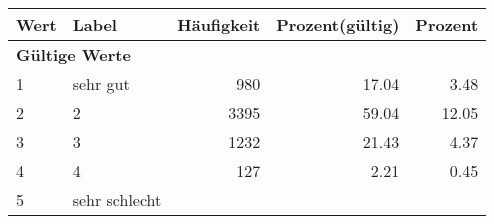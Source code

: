      \begin{longtable}{lXrrr}
     \toprule
     \textbf{Wert} & \textbf{Label} & \textbf{Häufigkeit} & \textbf{Prozent(gültig)} & \textbf{Prozent} \\
     \endhead
     \midrule
     \multicolumn{5}{l}{\textbf{Gültige Werte}}\\

     1 &
     \multicolumn{1}{X}{ sehr gut   } &


       \num{980} &
       \num[round-mode=places,round-precision=2]{17,04} &
         \num[round-mode=places,round-precision=2]{3,48} \\

     2 &
     \multicolumn{1}{X}{ 2   } &


       \num{3395} &
       \num[round-mode=places,round-precision=2]{59,04} &
         \num[round-mode=places,round-precision=2]{12,05} \\

     3 &
     \multicolumn{1}{X}{ 3   } &


       \num{1232} &
       \num[round-mode=places,round-precision=2]{21,43} &
         \num[round-mode=places,round-precision=2]{4,37} \\

     4 &
     \multicolumn{1}{X}{ 4   } &


       \num{127} &
       \num[round-mode=places,round-precision=2]{2,21} &
         \num[round-mode=places,round-precision=2]{0,45} \\

     5 &
     \multicolumn{1}{X}{ sehr schlecht   } &



\end{longtable}
